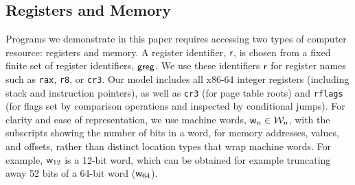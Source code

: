 \subsection{Registers and Memory}
Programs we demonstrate in this paper requires accessing two types of computer resource: registers and memory.
A register identifier, $\mathsf{r}$, is chosen from a fixed finite set of register identifiers, $\mathsf{greg}$. 
We use these identifiers $\mathsf{r}$ for register names such as \texttt{rax}, \texttt{r8}, or \texttt{cr3}. Our model includes
all x86-64 integer registers (including stack and instruction pointers), as well as \texttt{cr3} (for page table roots) and \texttt{rflags} (for
flags set by comparison operations and inspected by conditional jumps).
For clarity and ease of representation, we use machine words, $\mathsf{w}_n \in \mathcal{W}_n$, with the subscripts showing the number of bits in a word,
for memory addresses, values, and offsets, rather than distinct location types that wrap machine words.
For example, $\mathsf{w}_{12}$ is a 12-bit word, which can be obtained for example truncating away 52 bits of a 64-bit word ($\mathsf{w}_{64}$).
